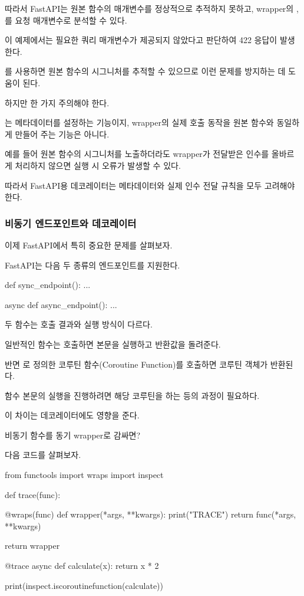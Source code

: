 따라서 FastAPI는 원본 함수의  매개변수를 정상적으로 추적하지 못하고, wrapper의 , 를 요청 매개변수로 분석할 수 있다.

이 예제에서는 필요한 쿼리 매개변수가 제공되지 않았다고 판단하여 422 응답이 발생한다.

를 사용하면 원본 함수의 시그니처를 추적할 수 있으므로 이런 문제를 방지하는 데 도움이 된다.

하지만 한 가지 주의해야 한다.

는 메타데이터를 설정하는 기능이지, wrapper의 실제 호출 동작을 원본 함수와 동일하게 만들어 주는 기능은 아니다.

예를 들어 원본 함수의 시그니처를 노출하더라도 wrapper가 전달받은 인수를 올바르게 처리하지 않으면 실행 시 오류가 발생할 수 있다.

따라서 FastAPI용 데코레이터는 메타데이터와 실제 인수 전달 규칙을 모두 고려해야 한다.

\subsubsection{비동기 엔드포인트와 데코레이터}

이제 FastAPI에서 특히 중요한 문제를 살펴보자.

FastAPI는 다음 두 종류의 엔드포인트를 지원한다.

\begin{dhkcode}
def sync_endpoint():
    ...

async def async_endpoint():
    ...
\end{dhkcode}

두 함수는 호출 결과와 실행 방식이 다르다.

일반적인  함수는 호출하면 본문을 실행하고 반환값을 돌려준다.

반면 로 정의한 코루틴 함수(Coroutine Function)를 호출하면 코루틴 객체가 반환된다.

함수 본문의 실행을 진행하려면 해당 코루틴을 하는 등의 과정이 필요하다.

이 차이는 데코레이터에도 영향을 준다.

\begin{dhknote}
\begin{dhksmry}[centered]
비동기 함수를 동기 wrapper로 감싸면?
\end{dhksmry}
\end{dhknote}

다음 코드를 살펴보자.

\begin{dhkcode}
from functools import wraps
import inspect


def trace(func):

    @wraps(func)
    def wrapper(*args, **kwargs):
        print("TRACE")
        return func(*args, **kwargs)

    return wrapper


@trace
async def calculate(x):
    return x * 2


print(inspect.iscoroutinefunction(calculate))
\end{dhkcode}

